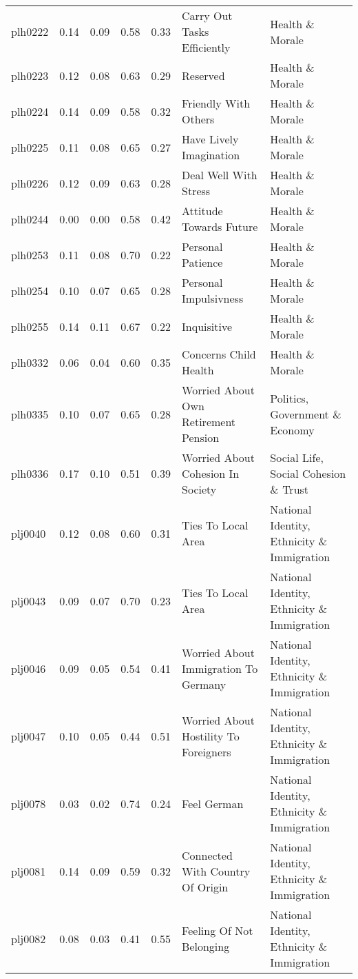 \documentclass[
  12pt,
]{article}
\begin{document}
\begin{landscape}
\begin{scriptsize}
\begin{longtable}{|p{1.75in}|p{0.3in}|p{0.3in}|p{0.3in}|p{0.3in}|p{2.5in}|p{2.5in}}
plh0222 & 0.14 & 0.09 & 0.58 & 0.33 & Carry Out Tasks Efficiently & Health \& Morale \\ 
plh0223 & 0.12 & 0.08 & 0.63 & 0.29 & Reserved & Health \& Morale \\ 
plh0224 & 0.14 & 0.09 & 0.58 & 0.32 & Friendly With Others & Health \& Morale \\ 
plh0225 & 0.11 & 0.08 & 0.65 & 0.27 & Have Lively Imagination & Health \& Morale \\ 
plh0226 & 0.12 & 0.09 & 0.63 & 0.28 & Deal Well With Stress & Health \& Morale \\ 
plh0244 & 0.00 & 0.00 & 0.58 & 0.42 & Attitude Towards Future & Health \& Morale \\ 
plh0253 & 0.11 & 0.08 & 0.70 & 0.22 & Personal Patience & Health \& Morale \\ 
plh0254 & 0.10 & 0.07 & 0.65 & 0.28 & Personal Impulsivness & Health \& Morale \\ 
plh0255 & 0.14 & 0.11 & 0.67 & 0.22 & Inquisitive & Health \& Morale \\ 
plh0332 & 0.06 & 0.04 & 0.60 & 0.35 & Concerns Child Health & Health \& Morale \\ 
plh0335 & 0.10 & 0.07 & 0.65 & 0.28 & Worried About Own Retirement Pension & Politics, Government \& Economy \\ 
plh0336 & 0.17 & 0.10 & 0.51 & 0.39 & Worried About Cohesion In Society & Social Life, Social Cohesion \& Trust \\ 
plj0040 & 0.12 & 0.08 & 0.60 & 0.31 & Ties To Local Area & National Identity, Ethnicity \& Immigration \\ 
plj0043 & 0.09 & 0.07 & 0.70 & 0.23 & Ties To Local Area & National Identity, Ethnicity \& Immigration \\ 
plj0046 & 0.09 & 0.05 & 0.54 & 0.41 & Worried About Immigration To Germany & National Identity, Ethnicity \& Immigration \\ 
plj0047 & 0.10 & 0.05 & 0.44 & 0.51 & Worried About Hostility To Foreigners & National Identity, Ethnicity \& Immigration \\ 
plj0078 & 0.03 & 0.02 & 0.74 & 0.24 & Feel German & National Identity, Ethnicity \& Immigration \\ 
plj0081 & 0.14 & 0.09 & 0.59 & 0.32 & Connected With Country Of Origin & National Identity, Ethnicity \& Immigration \\ 
plj0082 & 0.08 & 0.03 & 0.41 & 0.55 & Feeling Of Not Belonging & National Identity, Ethnicity \& Immigration \\ 

\end{longtable}
\end{scriptsize}
\end{landscape}
\end{document}
